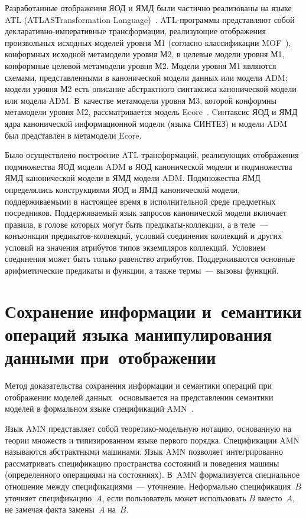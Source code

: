 \begin{multicols}{2}
        Разработанные отображения ЯОД и ЯМД были частично реализованы на 
языке ATL (ATLAS\linebreak Transformation Language)~\cite{18-stu}. ATL-программы 
пред\-став\-ля\-ют собой де\-кла\-ра\-тив\-но-им\-пе\-ра\-тив\-ные трансформации, 
реализующие отображения произвольных исходных моделей уровня М1 
(согласно классификации MOF~\cite{19-stu}), конформных исходной 
метамодели уровня М2, в целевые модели уровня М1, конформные целевой 
метамодели уровня М2. Модели уровня М1 являются схемами, 
представленными в канонической модели данных или модели ADM; модели 
уровня М2 есть описание абстрактного синтаксиса канонической модели или 
модели ADM. В~качестве метамодели уровня М3, которой конформны 
метамодели уровня M2, рассматривается модель Ecore~\cite{20-stu}. Cинтаксис 
ЯОД и ЯМД ядра канонической информационной модели (языка СИНТЕЗ) и 
модели ADM был представлен в метамодели Ecore. 
        
        Было осуществлено построение ATL-транс\-фор\-ма\-ций, реализующих 
отображения подмножества ЯОД модели ADM в ЯОД канонической модели и 
подмножества ЯМД канонической модели в ЯМД модели ADM. Подмножества 
ЯМД определялись конструкциями ЯОД и ЯМД канонической модели, 
поддерживаемыми в настоящее время в исполнительной среде предметных 
посредников. Поддерживаемый язык запросов канонической модели включает 
правила, в голове которых могут быть пре\-ди\-ка\-ты-кол\-лек\-ции, а в теле~--- 
конъюнкция пре\-ди\-ка\-тов-кол\-лек\-ций, условий соединения коллекций и 
других условий на значения атрибутов типов экземпляров коллекций. 
Условием соединения может быть только равенство атрибутов. 
Поддерживаются основные арифметические предикаты и функции, а также 
термы~--- вызовы функций. 

\section{Сохранение информации и~семантики операций языка манипулирования данными 
при~отображении}
        
        Метод доказательства сохранения информации и семантики операций 
при отображении моделей данных~\cite{21-stu} основывается на представлении 
семантики моделей в формальном языке спецификаций AMN~\cite{16-stu}. 
        
        Язык AMN представляет собой тео\-ре\-ти\-ко-мо\-дель\-ную нотацию, 
основанную на теории множеств и типизированном языке первого порядка. 
Спецификации AMN называются абстрактными машинами. Язык AMN позволяет 
интегрированно рас\-смат\-ри\-вать спецификацию пространства состояний и 
поведения машины (определенного операциями на состояниях). В~AMN 
формализуется специальное отношение между спецификациями~--- 
{уточнение}. Неформально спецификация~$B$ уточняет 
спецификацию~$A$, если пользователь может использовать $B$ вместо~$A$, 
не замечая факта замены~$A$ на~$B$. 
{

}
\end{multicols}
